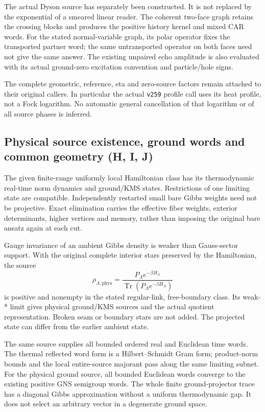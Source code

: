 The actual Dyson source has separately been constructed. It is not
replaced by the exponential of a smeared linear reader. The coherent
two-face graph retains the crossing blocks and produces the positive
history kernel and mixed CAR words. For the stated normal-variable
graph, its polar operator fixes the transported partner word; the same
untransported operator on both faces need not give the same answer.
The existing unpaired echo amplitude is also evaluated with its actual
ground-zero excitation convention and particle/hole signs.

The complete geometric, reference, eta and zero-source factors remain
attached to their original callers. In particular the actual
\texttt{v259} profile call uses its
heat profile, not a Fock logarithm. No automatic general cancellation of
that logarithm or of all source phases is inferred.

\subsection*{Physical source existence, ground words and common geometry (H, I, J)}

The given finite-range uniformly local Hamiltonian class has its
thermodynamic real-time norm dynamics and ground/KMS states.
Restrictions of one limiting state are compatible. Independently
restarted small bare Gibbs weights need not be projective. Exact
elimination carries the effective fiber weights, exterior determinants,
higher vertices and memory, rather than imposing the original bare
ansatz again at each cut.

Gauge invariance of an ambient Gibbs density is weaker than Gauss-sector
support. With the original complete interior stars preserved by the
Hamiltonian, the source
\[
 \rho_{\Lambda,\mathrm{phys}}
 =\frac{P_\Lambda e^{-\beta H_\Lambda}}
        {\operatorname{Tr}(P_\Lambda e^{-\beta H_\Lambda})}
\]
is positive and nonempty in the stated regular-link, free-boundary
class. Its weak-* limit gives physical ground/KMS sources and the
actual quotient representation. Broken seam or boundary stars are
not added. The projected state can differ from the earlier ambient
state.

The same source supplies all bounded ordered real and Euclidean
time words. The thermal reflected word form is a Hilbert--Schmidt
Gram form; product-norm bounds and the local entire-source majorant
pass along the same limiting subnet. For the physical ground source,
all bounded Euclidean words converge to the existing positive GNS
semigroup words. The whole finite ground-projector trace has a
diagonal Gibbs approximation without a uniform thermodynamic gap.
It does not select an arbitrary vector in a degenerate ground space.

